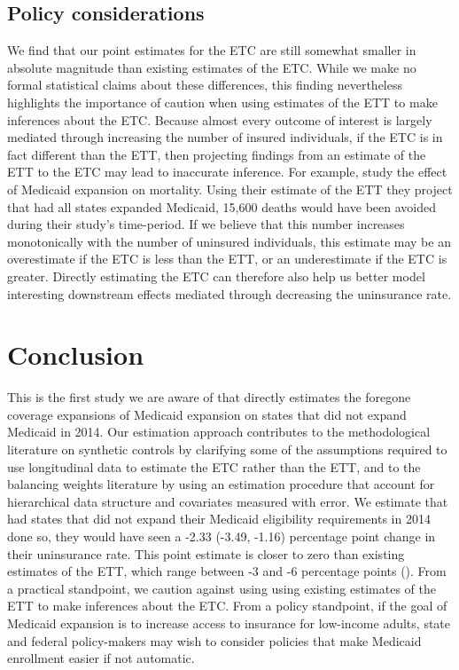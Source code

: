\subsection{Policy considerations}

We find that our point estimates for the ETC are still somewhat smaller in absolute magnitude than existing estimates of the ETC. While we make no formal statistical claims about these differences, this finding nevertheless highlights the importance of caution when using estimates of the ETT to make inferences about the ETC. Because almost every outcome of interest is largely mediated through increasing the number of insured individuals, if the ETC is in fact different than the ETT, then projecting findings from an estimate of the ETT to the ETC may lead to inaccurate inference. For example, \cite{miller2019medicaid} study the effect of Medicaid expansion on mortality. Using their estimate of the ETT they project that had all states expanded Medicaid, 15,600 deaths would have been avoided during their study's time-period. If we believe that this number increases monotonically with the number of uninsured individuals, this estimate may be an overestimate if the ETC is less than the ETT, or an underestimate if the ETC is greater. Directly estimating the ETC can therefore also help us better model interesting downstream effects mediated through decreasing the uninsurance rate. 

\section{Conclusion}

This is the first study we are aware of that directly estimates the foregone coverage expansions of Medicaid expansion on states that did not expand Medicaid in 2014. Our estimation approach contributes to the methodological literature on synthetic controls by clarifying some of the assumptions required to use longitudinal data to estimate the ETC rather than the ETT, and to the balancing weights literature by using an estimation procedure that account for hierarchical data structure and covariates measured with error. We estimate that had states that did not expand their Medicaid eligibility requirements in 2014 done so, they would have seen a -2.33 (-3.49, -1.16) percentage point change in their uninsurance rate. This point estimate is closer to zero than existing estimates of the ETT, which range between -3 and -6 percentage points (\cite{frean2017premium}). From a practical standpoint, we caution against using using existing estimates of the ETT to make inferences about the ETC. From a policy standpoint, if the goal of Medicaid expansion is to increase access to insurance for low-income adults, state and federal policy-makers may wish to consider policies that make Medicaid enrollment easier if not automatic.

